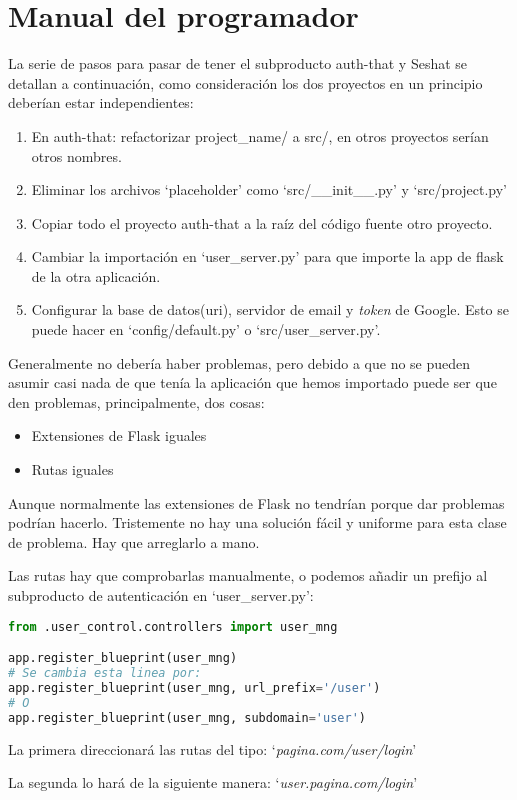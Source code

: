 \section{Manual del programador}

La serie de pasos para pasar de tener el subproducto auth-that y Seshat se detallan a continuación, como consideración los dos proyectos en un principio deberían estar independientes:

\begin{enumerate}
\setlength{\itemsep}{1pt}
\setlength{\parskip}{0pt}
\setlength{\parsep}{0pt}
\item En auth-that: refactorizar project\_name/ a  src/, en otros proyectos serían otros nombres.
\item Eliminar los archivos `placeholder' como `src/\_\_init\_\_.py' y `src/project.py'
\item Copiar todo el proyecto auth-that a la raíz del código fuente otro proyecto.
\item Cambiar la importación en `user\_server.py' para que importe la app de flask de la otra aplicación.
\item Configurar la base de datos(uri), servidor de email y \textit{token} de Google. Esto se puede hacer en `config/default.py' o `src/user\_server.py'.
\end{enumerate}

Generalmente no debería haber problemas, pero debido a que no se pueden asumir casi nada de que tenía la aplicación que hemos importado puede ser que den problemas, principalmente, dos cosas:

\begin{itemize}
\setlength{\itemsep}{1pt}
\setlength{\parskip}{0pt}
\setlength{\parsep}{0pt}
\item Extensiones de Flask iguales
\item Rutas iguales
\end{itemize}

Aunque normalmente las extensiones de Flask no tendrían porque dar problemas podrían hacerlo. Tristemente no hay una solución fácil y uniforme para esta clase de problema. Hay que arreglarlo a mano.

Las rutas hay que comprobarlas manualmente, o podemos añadir un prefijo al subproducto de autenticación en `user\_server.py':


\lstset{style=blockstyle}
\begin{lstlisting}[language=Python]
from .user_control.controllers import user_mng

app.register_blueprint(user_mng)
# Se cambia esta linea por:
app.register_blueprint(user_mng, url_prefix='/user')
# O
app.register_blueprint(user_mng, subdomain='user')
\end{lstlisting}

La primera direccionará las rutas del tipo: `\textit{pagina.com/user/login}'

La segunda lo hará de la siguiente manera: `\textit{user.pagina.com/login}'






